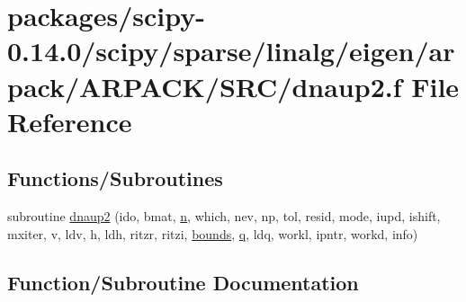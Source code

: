 \hypertarget{dnaup2_8f}{}\section{packages/scipy-\/0.14.0/scipy/sparse/linalg/eigen/arpack/\+A\+R\+P\+A\+C\+K/\+S\+R\+C/dnaup2.f File Reference}
\label{dnaup2_8f}
\subsection*{Functions/\+Subroutines}
\begin{DoxyCompactItemize}
\item 
subroutine \hyperlink{dnaup2_8f_abd3dc2c9445890f091ed31873cc0a69d}{dnaup2} (ido, bmat, \hyperlink{indexexpr_8h_ab427e2e2b4d6cec55fa088ea2a692ace}{n}, which, nev, np, tol, resid, mode, iupd, ishift, mxiter, v, ldv, h, ldh, ritzr, ritzi, \hyperlink{structbounds}{bounds}, \hyperlink{indexexpr_8h_ac886c3584e464b5533390d7440c9dd98}{q}, ldq, workl, ipntr, workd, info)
\end{DoxyCompactItemize}


\subsection{Function/\+Subroutine Documentation}
\hypertarget{dnaup2_8f_abd3dc2c9445890f091ed31873cc0a69d}{}
